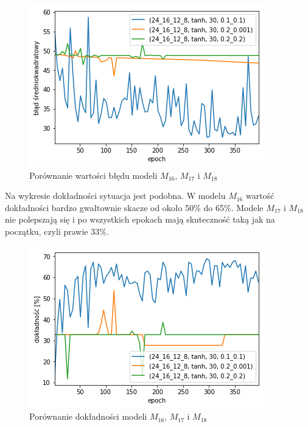 \documentclass{report}
\begin{document}
    \begin{figure}[htp]
        \centering
        \includegraphics[scale=0.8]{./img/lr-error-tanh.png}
        \caption{Porównanie wartości błędu modeli $M_{16}$, $M_{17}$ i $M_{18}$}
    \end{figure}


    Na wykresie dokładności sytuacja jest podobna.
    W modelu $M_{16}$ wartość dokładności bardzo gwałtownie skacze od około 50\% do 65\%.
    Modele $M_{17}$ i $M_{18}$ nie polepszają się i po wszystkich epokach mają skuteczność taką jak na początku, czyli prawie 33\%.

    \begin{figure}[htp]
        \centering
        \includegraphics[scale=0.8]{././img/lr-accuracy-tanh.png}
        \caption{Porównanie dokładności modeli $M_{16}$, $M_{17}$ i $M_{18}$}
    \end{figure}
\end{document}
